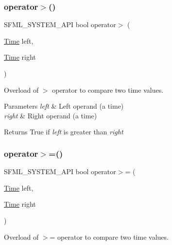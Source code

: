 \subsubsection{\texorpdfstring{operator$>$()}{operator>()}}
{\footnotesize\ttfamily S\+F\+M\+L\+\_\+\+S\+Y\+S\+T\+E\+M\+\_\+\+A\+PI bool operator$>$ (\begin{DoxyParamCaption}\item[{\mbox{\hyperlink{classsf_1_1_time}{Time}}}]{left,  }\item[{\mbox{\hyperlink{classsf_1_1_time}{Time}}}]{right }\end{DoxyParamCaption})\hspace{0.3cm}{\ttfamily [related]}}



Overload of $>$ operator to compare two time values. 


\begin{DoxyParams}{Parameters}
{\em left} & Left operand (a time) \\
\hline
{\em right} & Right operand (a time)\\
\hline
\end{DoxyParams}
\begin{DoxyReturn}{Returns}
True if {\itshape left} is greater than {\itshape right} \begin{DoxyVerb}\end{DoxyVerb}
 
\end{DoxyReturn}
\mbox{\label{classsf_1_1_time_ad69edc80cd01b7a03f5673b4276181eb}} 
\subsubsection{\texorpdfstring{operator$>$=()}{operator>=()}}
{\footnotesize\ttfamily S\+F\+M\+L\+\_\+\+S\+Y\+S\+T\+E\+M\+\_\+\+A\+PI bool operator$>$= (\begin{DoxyParamCaption}\item[{\mbox{\hyperlink{classsf_1_1_time}{Time}}}]{left,  }\item[{\mbox{\hyperlink{classsf_1_1_time}{Time}}}]{right }\end{DoxyParamCaption})\hspace{0.3cm}{\ttfamily [related]}}



Overload of $>$= operator to compare two time values. 


